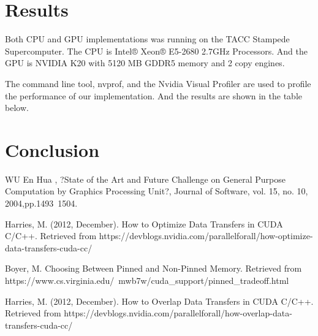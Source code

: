 \documentclass[journal,12pt,onecolumn,draftclsnofoot]{ieeeconf}  %
\begin{document}
\section{Results}
Both CPU and GPU implementations was running on the TACC Stampede Supercomputer. The CPU is Intel® Xeon® E5-2680 2.7GHz Processors. And the GPU is NVIDIA K20 with 5120 MB GDDR5 memory and 2 copy engines. \par
The command line tool, nvprof, and the Nvidia Visual Profiler are used to profile the performance of our implementation. And the results are shown in the table below.

\section{Conclusion} 


\begin{thebibliography}{9}
WU En Hua , ?State of the Art and Future Challenge on General 
Purpose Computation by Graphics Processing Unit?, Journal of 
Software, vol. 15, no. 10, 2004,pp.1493~1504.

Harries, M. (2012, December). How to Optimize Data Transfers in CUDA C/C++. Retrieved from https://devblogs.nvidia.com/parallelforall/how-optimize-data-transfers-cuda-cc/
	
Boyer, M. Choosing Between Pinned and Non-Pinned Memory. Retrieved from https://www.cs.virginia.edu/~mwb7w/cuda_support/pinned_tradeoff.html
	
Harries, M. (2012, December). How to Overlap Data Transfers in CUDA C/C++. Retrieved from https://devblogs.nvidia.com/parallelforall/how-overlap-data-transfers-cuda-cc/
	

\end{thebibliography}
\end{document}
